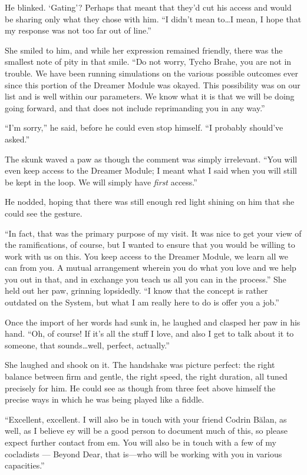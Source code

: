 He blinked. `Gating'? Perhaps that meant that they'd cut his access and would be sharing only what they chose with him. ``I didn't mean to\ldots I mean, I hope that my response was not too far out of line.''

She smiled to him, and while her expression remained friendly, there was the smallest note of pity in that smile. ``Do not worry, Tycho Brahe, you are not in trouble. We have been running simulations on the various possible outcomes ever since this portion of the Dreamer Module was okayed. This possibility was on our list and is well within our parameters. We know what it is that we will be doing going forward, and that does not include reprimanding you in any way.''

``I'm sorry,'' he said, before he could even stop himself. ``I probably should've asked.''

The skunk waved a paw as though the comment was simply irrelevant. ``You will even keep access to the Dreamer Module; I meant what I said when you will still be kept in the loop. We will simply have \emph{first} access.''

He nodded, hoping that there was still enough red light shining on him that she could see the gesture.

``In fact, that was the primary purpose of my visit. It was nice to get your view of the ramifications, of course, but I wanted to ensure that you would be willing to work with us on this. You keep access to the Dreamer Module, we learn all we can from you. A mutual arrangement wherein you do what you love and we help you out in that, and in exchange you teach us all you can in the process.'' She held out her paw, grinning lopsidedly. ``I know that the concept is rather outdated on the System, but what I am really here to do is offer you a job.''

Once the import of her words had sunk in, he laughed and clasped her paw in his hand. ``Oh, of course! If it's all the stuff I love, and also I get to talk about it to someone, that sounds\ldots well, perfect, actually.''

She laughed and shook on it. The handshake was picture perfect: the right balance between firm and gentle, the right speed, the right duration, all tuned precisely for him. He could see as though from three feet above himself the precise ways in which he was being played like a fiddle.

``Excellent, excellent. I will also be in touch with your friend Codrin Bălan, as well, as I believe ey will be a good person to document much of this, so please expect further contact from em. You will also be in touch with a few of my cocladists — Beyond Dear, that is—who will be working with you in various capacities.''

